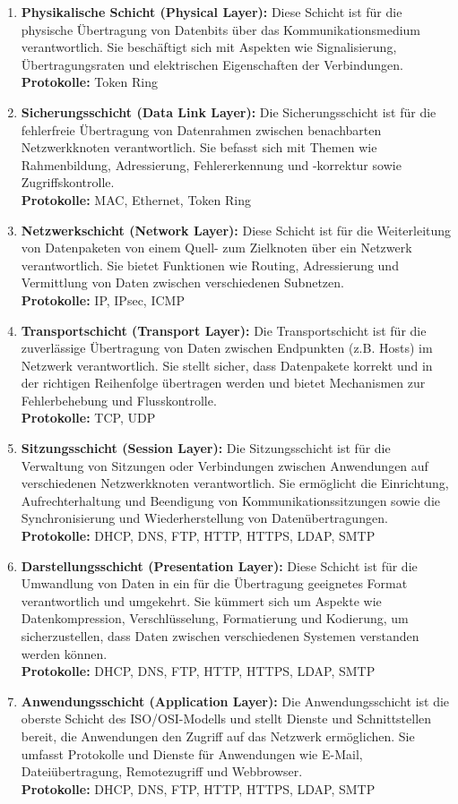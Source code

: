 \begin{enumerate}
	\item \textbf{Physikalische Schicht (Physical Layer):} Diese Schicht ist für die physische Übertragung von Datenbits über das Kommunikationsmedium verantwortlich. Sie beschäftigt sich mit Aspekten wie Signalisierung, Übertragungsraten und elektrischen Eigenschaften der Verbindungen.\\
	\textbf{Protokolle:} Token Ring
	\item \textbf{Sicherungsschicht (Data Link Layer):} Die Sicherungsschicht ist für die fehlerfreie Übertragung von Datenrahmen zwischen benachbarten Netzwerkknoten verantwortlich. Sie befasst sich mit Themen wie Rahmenbildung, Adressierung, Fehlererkennung und -korrektur sowie Zugriffskontrolle.\\
	\textbf{Protokolle:} MAC, Ethernet, Token Ring
	\item \textbf{Netzwerkschicht (Network Layer):} Diese Schicht ist für die Weiterleitung von Datenpaketen von einem Quell- zum Zielknoten über ein Netzwerk verantwortlich. Sie bietet Funktionen wie Routing, Adressierung und Vermittlung von Daten zwischen verschiedenen Subnetzen.\\
	\textbf{Protokolle:} IP, IPsec, ICMP
	\item \textbf{Transportschicht (Transport Layer):} Die Transportschicht ist für die zuverlässige Übertragung von Daten zwischen Endpunkten (z.B. Hosts) im Netzwerk verantwortlich. Sie stellt sicher, dass Datenpakete korrekt und in der richtigen Reihenfolge übertragen werden und bietet Mechanismen zur Fehlerbehebung und Flusskontrolle.\\
	\textbf{Protokolle:} TCP, UDP
	\item \textbf{Sitzungsschicht (Session Layer):} Die Sitzungsschicht ist für die Verwaltung von Sitzungen oder Verbindungen zwischen Anwendungen auf verschiedenen Netzwerkknoten verantwortlich. Sie ermöglicht die Einrichtung, Aufrechterhaltung und Beendigung von Kommunikationssitzungen sowie die Synchronisierung und Wiederherstellung von Datenübertragungen.\\
	\textbf{Protokolle:} DHCP, DNS, FTP, HTTP, HTTPS, LDAP, SMTP
	\item \textbf{Darstellungsschicht (Presentation Layer):} Diese Schicht ist für die Umwandlung von Daten in ein für die Übertragung geeignetes Format verantwortlich und umgekehrt. Sie kümmert sich um Aspekte wie Datenkompression, Verschlüsselung, Formatierung und Kodierung, um sicherzustellen, dass Daten zwischen verschiedenen Systemen verstanden werden können.\\
	\textbf{Protokolle:} DHCP, DNS, FTP, HTTP, HTTPS, LDAP, SMTP
	\item \textbf{Anwendungsschicht (Application Layer):} Die Anwendungsschicht ist die oberste Schicht des ISO/OSI-Modells und stellt Dienste und Schnittstellen bereit, die Anwendungen den Zugriff auf das Netzwerk ermöglichen. Sie umfasst Protokolle und Dienste für Anwendungen wie E-Mail, Dateiübertragung, Remotezugriff und Webbrowser.\\
	\textbf{Protokolle:} DHCP, DNS, FTP, HTTP, HTTPS, LDAP, SMTP
\end{enumerate}

